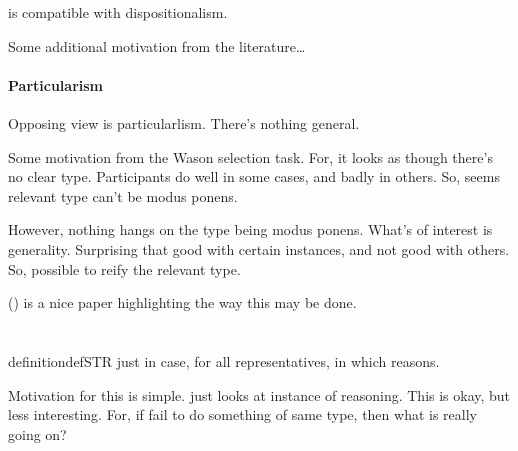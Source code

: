 \begin{note}
  \tR{} is compatible with dispositionalism.

\end{note}

\begin{note}
  Some additional motivation from the literature\dots
\end{note}

\paragraph{Particularism}

\begin{note}
  Opposing view is particularlism.
  There's nothing general.

  Some motivation from the Wason selection task.
  For, it looks as though there's no clear type.
  Participants do well in some cases, and badly in others.
  So, seems relevant type can't be modus ponens.

  However, nothing hangs on the type being modus ponens.
  What's of interest is generality.
  Surprising that good with certain instances, and not good with others.
  So, possible to reify the relevant type.

  (\cite{Fodor:2000aa}) is a nice paper highlighting the way this may be done.
\end{note}


\section{}
\label{sec:str2}

\begin{note}
  \begin{restatable}[\sTR{2}]{definition}{defSTR}
    \sTR{} just in case, for all representatives, \pevent{} in which reasons.
  \end{restatable}

  Motivation for this is simple.
  \tR{} just looks at instance of reasoning.
  This is okay, but less interesting.
  For, if fail to do something of same type, then what is really going on?
\end{note}

